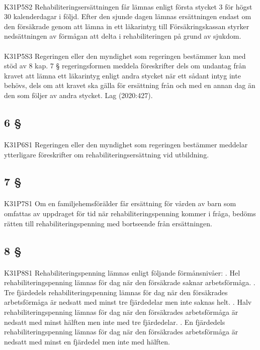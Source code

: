 \documentclass[a4paper,notitlepage,openany,10pt]{book}
\begin{document}
\paragraph*{}
{\tiny K31P5S2}
Rehabiliteringsersättningen får lämnas enligt första stycket 3 för högst 30 kalenderdagar i följd. Efter den sjunde dagen lämnas ersättningen endast om den försäkrade genom att lämna in ett läkarintyg till Försäkringskassan styrker nedsättningen av förmågan att delta i rehabiliteringen på grund av sjukdom.
\paragraph*{}
{\tiny K31P5S3}
Regeringen eller den myndighet som regeringen bestämmer kan med stöd av 8 kap. 7 § regeringsformen meddela föreskrifter dels om undantag från kravet att lämna ett läkarintyg enligt andra stycket när ett sådant intyg inte behövs, dels om att kravet ska gälla för ersättning från och med en annan dag än den som följer av andra stycket.
Lag (2020:427).
\subsection*{6 §}
\paragraph*{}
{\tiny K31P6S1}
Regeringen eller den myndighet som regeringen bestämmer meddelar ytterligare föreskrifter om rehabiliteringsersättning vid utbildning.
\subsection*{7 §}
\paragraph*{}
{\tiny K31P7S1}
Om en familjehemsförälder får ersättning för vården av barn som omfattas av uppdraget för tid när rehabiliteringspenning kommer i fråga, bedöms rätten till rehabiliteringspenning med bortseende från ersättningen.
\subsection*{8 §}
\paragraph*{}
{\tiny K31P8S1}
Rehabiliteringspenning lämnas enligt följande förmånsnivåer:
. Hel rehabiliteringspenning lämnas för dag när den försäkrade saknar arbetsförmåga.
. Tre fjärdedels rehabiliteringspenning lämnas för dag när den försäkrades arbetsförmåga är nedsatt med minst tre fjärdedelar men inte saknas helt.
. Halv rehabiliteringspenning lämnas för dag när den försäkrades arbetsförmåga är nedsatt med minst hälften men inte med tre fjärdedelar.
. En fjärdedels rehabiliteringspenning lämnas för dag när den försäkrades arbetsförmåga är nedsatt med minst en fjärdedel men inte med hälften.
\end{document}
